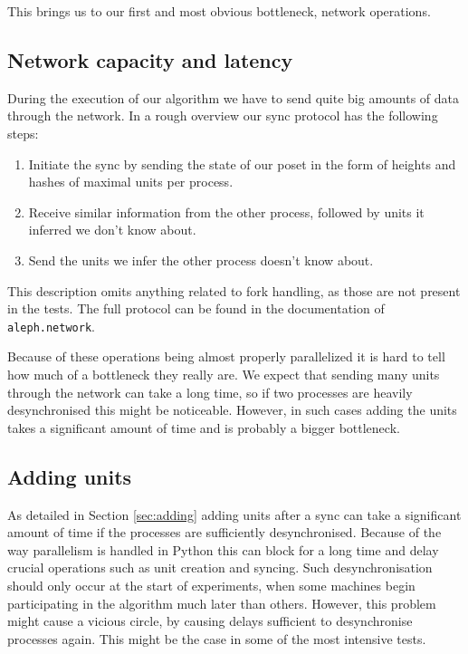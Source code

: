 \documentclass[a4paper,10pt]{article}
\begin{document}
		This brings us to our first and most obvious bottleneck, network operations.
		\subsection{Network capacity and latency}
			During the execution of our algorithm we have to send quite big amounts of data through the network.
			In a rough overview our sync protocol has the following steps:
			\begin{enumerate}
				\item Initiate the sync by sending the state of our poset in the form of heights and hashes of maximal units per process.
				\item Receive similar information from the other process, followed by units it inferred we don't know about.
				\item Send the units we infer the other process doesn't know about.
			\end{enumerate}
			This description omits anything related to fork handling, as those are not present in the tests.
			The full protocol can be found in the documentation of \lstinline{aleph.network}.

			Because of these operations being almost properly parallelized it is hard to tell how much of a bottleneck they really are.
			We expect that sending many units through the network can take a long time, so if two processes are heavily desynchronised this might be noticeable.
			However, in such cases adding the units takes a significant amount of time and is probably a bigger bottleneck.
		\subsection{Adding units}
			As detailed in Section \ref{sec:adding} adding units after a sync can take a significant amount of time if the processes are sufficiently desynchronised.
			Because of the way parallelism is handled in Python this can block for a long time and delay crucial operations such as unit creation and syncing.
			Such desynchronisation should only occur at the start of experiments, when some machines begin participating in the algorithm much later than others.
			However, this problem might cause a vicious circle, by causing delays sufficient to desynchronise processes again.
			This might be the case in some of the most intensive tests.
\end{document}
